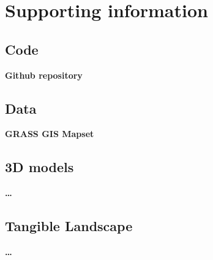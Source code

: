 \documentclass[final,3p,times,twocolumn]{elsarticle}
\begin{document}
\appendix

\section{Supporting information}

\subsection{Code}\label{code}
{\bf Github repository}

\subsection{Data}\label{data}
{\bf GRASS GIS Mapset}

\subsection{3D models}\label{3d_models}
{\bf \ldots}

\subsection{Tangible Landscape}\label{tangible_landscape}
{\bf \ldots}


% 
 
% 
% 
% 
% 
% 
% 
% 
% 
% 
% 
% 


\end{document}
